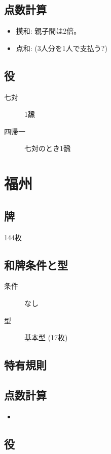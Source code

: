 \documentclass{ltjsarticle}
\begin{document}
\subsection{点数計算}
\begin{itemize}
    \item 摸和: 親子間は2倍。
    \item 点和: (3人分を1人で支払う?)
\end{itemize}
\subsection{役}
\begin{description}
    \item[七対] 1飜
    \item[四帰一] 七対のとき1飜
\end{description}
\section{福州}
\subsection{牌}144枚
\subsection{和牌条件と型}
\begin{description}
    \item[条件] なし
    \item[型] 基本型 (17枚)
\end{description}
\subsection{特有規則}
\begin{description}
    \item[]
\end{description}
\subsection{点数計算}
\begin{itemize}
    \item
\end{itemize}
\subsection{役}
\begin{description}
    \item[]
\end{description}
\end{document}
